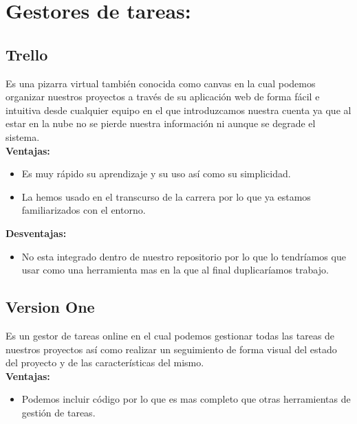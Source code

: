 


\section{Gestores de tareas:}
\subsection{Trello}
Es una pizarra virtual también conocida como canvas en la cual podemos organizar nuestros proyectos a través de su aplicación web de forma fácil e intuitiva desde cualquier equipo en el que introduzcamos nuestra cuenta ya que al estar en la nube no se pierde nuestra información ni aunque se degrade el sistema.
\\

\textbf{Ventajas:}

\begin{itemize}
\item Es muy rápido su aprendizaje y su uso así como su simplicidad.

\item La hemos usado en el transcurso de la carrera por lo que ya estamos familiarizados con el entorno.
\end{itemize}

\textbf{Desventajas:}

\begin{itemize}
\item No esta integrado dentro de nuestro repositorio por lo que lo tendríamos que usar como una herramienta mas en la que al final duplicaríamos trabajo.
\end{itemize}


\subsection{Version One}
Es un gestor de tareas online en el cual podemos gestionar todas las tareas de nuestros proyectos así como realizar un seguimiento de forma visual del estado del proyecto y de las características del mismo. 
\\

\textbf{Ventajas:}

\begin{itemize}
\item Podemos incluir código por lo que es mas completo que otras herramientas de gestión de tareas.
\end{itemize}

